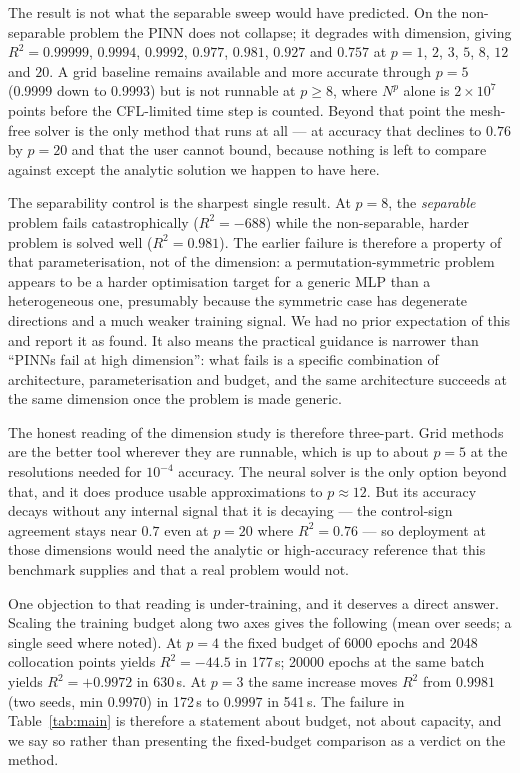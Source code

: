 \documentclass[conference]{IEEEtran}
\begin{document}


The result is not what the separable sweep would have predicted. On the non-separable problem the
PINN does not collapse; it degrades with dimension, giving $R^2 = 0.99999$, $0.9994$,
$0.9992$, $0.977$, $0.981$, $0.927$ and $0.757$ at $p = 1$, $2$, $3$, $5$, $8$, $12$ and $20$. A
grid baseline remains available and more accurate through $p=5$ (0.9999 down to
0.9993) but is not runnable at $p \ge 8$, where $N^p$ alone is $2\times10^7$ points before the
CFL-limited time step is counted. Beyond that point the mesh-free solver is the only method that
runs at all --- at accuracy that declines to $0.76$ by $p=20$ and that the user cannot bound,
because nothing is left to compare against except the analytic solution we happen to have
here.

The separability control is the sharpest single result. At $p=8$, the \emph{separable} problem
fails catastrophically ($R^2 = -688$) while the non-separable, harder problem is solved
well ($R^2 = 0.981$). The earlier failure is therefore a property of that parameterisation, not of
the dimension: a permutation-symmetric problem appears to be a harder optimisation target for a
generic MLP than a heterogeneous one, presumably because the symmetric case has degenerate
directions and a much weaker training signal. We had no prior expectation of this and report it as
found. It also means the practical guidance is narrower than ``PINNs fail at high dimension'': what
fails is a specific combination of architecture, parameterisation and budget, and the same
architecture succeeds at the same dimension once the problem is made generic.

The honest reading of the dimension study is therefore three-part. Grid methods are the better tool
wherever they are runnable, which is up to about $p=5$ at the resolutions needed for $10^{-4}$
accuracy. The neural solver is the only option beyond that, and it does produce usable
approximations to $p \approx 12$. But its accuracy decays without any internal signal that it is
decaying --- the control-sign agreement stays near $0.7$ even at $p=20$ where $R^2 = 0.76$ --- so
deployment at those dimensions would need the analytic or high-accuracy reference that this
benchmark supplies and that a real problem would not.

One objection to that reading is under-training, and it deserves a direct answer. Scaling the
training budget along two
axes gives the following (mean over seeds; a single seed where noted). At $p=4$ the fixed
budget of 6000 epochs and 2048 collocation points yields $R^2 = -44.5$ in 177\,s; 20000 epochs
at the same batch yields $R^2 = +0.9972$ in 630\,s. At $p=3$ the same increase moves $R^2$ from
$0.9981$ (two seeds, min $0.9970$) in 172\,s to $0.9997$ in 541\,s. The failure in
Table~\ref{tab:main} is therefore a statement about budget, not about capacity, and we say so
rather than presenting the fixed-budget comparison as a verdict on the method.
\end{document}
